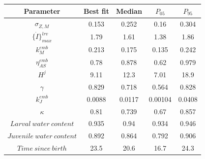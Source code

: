 \begin{tabular}{ccccc}
\toprule
Parameter & Best fit & Median & $P_{05}$ & $P_{95}$\\
\midrule
$\sigma_{Z,M}$ & 0.153 & 0.252 & 0.16 & 0.304\\
$\{ \dot{I} \}_{max}^{lrv}$ & 1.79 & 1.61 & 1.38 & 1.86\\
$k_M^{emb}$ & 0.213 & 0.175 & 0.135 & 0.242\\
$\eta_{AS}^{emb}$ & 0.78 & 0.878 & 0.62 & 0.979\\
$H^{j}$ & 9.11 & 12.3 & 7.01 & 18.9\\
$\gamma$ & 0.829 & 0.718 & 0.564 & 0.828\\
$k_J^{emb}$ & 0.0088 & 0.0117 & 0.00104 & 0.0408\\
$\kappa$ & 0.81 & 0.739 & 0.67 & 0.857\\
$Larval\ water\ content$ & 0.935 & 0.94 & 0.934 & 0.946\\
$Juvenile\ water\ content$ & 0.892 & 0.864 & 0.792 & 0.906\\
$Time\ since\ birth$ & 23.5 & 20.6 & 16.7 & 24.3\\
\bottomrule
\end{tabular}
